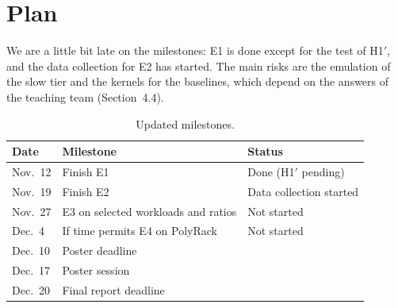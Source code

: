 \documentclass[10pt,a4paper]{article}
\begin{document}
\section{Plan}
We are a little bit late on the milestones: E1 is done except for the test of H1$'$, and the data collection for E2 has started. The main risks are the emulation of the slow tier and the kernels for the baselines, which depend on the answers of the teaching team (Section~4.4).

\begin{table}[H]
\centering
\small
\begin{tabular}{lll}
\toprule
Date & Milestone & Status \\
\midrule
Nov.~12 & Finish E1 & Done (H1$'$ pending) \\
Nov.~19 & Finish E2 & Data collection started \\
Nov.~27 & E3 on selected workloads and ratios & Not started \\
Dec.~4 & If time permits E4 on PolyRack & Not started \\
Dec.~10 & Poster deadline & \\
Dec.~17 & Poster session & \\
Dec.~20 & Final report deadline & \\
\bottomrule
\end{tabular}
\caption{Updated milestones.}
\label{tab:plan}
\end{table}
\end{document}
